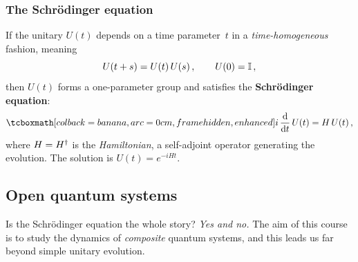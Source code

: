 \subsubsection{The Schr\"odinger equation}%
\label{sec:schrodinger-eq}

If the unitary $U(t)$ depends on a time parameter~$t$ in a
\emph{time-homogeneous} fashion, meaning
\begin{equation}\label{eq:time-homogeneous}
  U(t+s) = U(t)\,U(s)\,,\qquad U(0) = \mathbb{I}\,,
\end{equation}
then $U(t)$ forms a one-parameter group and satisfies the
\textbf{Schr\"odinger equation}:
\begin{equation}\label{eq:schrodinger}
  \eqbox{i\,\frac{\dd}{\dd t}\,U(t) = H\, U(t)}\,,
\end{equation}
where $H = H^\dagger$ is the \emph{Hamiltonian}, a self-adjoint operator
generating the evolution.  The solution is
$U(t) = e^{-iHt}$.

\subsection{Open quantum systems}\label{sec:open-systems}

Is the Schr\"odinger equation the whole story?  \emph{Yes and no.}
The aim of this course is to study the dynamics of \emph{composite}
quantum systems, and this leads us far beyond simple unitary evolution.

\begin{center}
\end{center}

